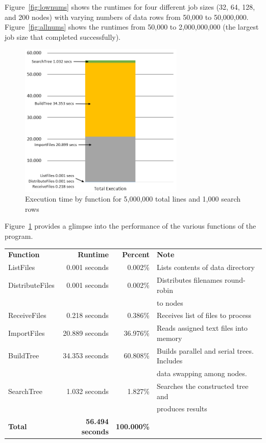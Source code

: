 Figure~\ref{fig:lownums} shows the runtimes for four different job sizes (32, 64, 128, and 200 nodes) with varying numbers of data rows from 50,000 to 50,000,000. Figure~\ref{fig:allnums} shows the runtimes from 50,000 to 2,000,000,000 (the largest job size that completed successfully).


\begin{figure}[h!]
\centering
\includegraphics[width=0.7\textwidth]{./images/Runtime3.png}
\caption{Execution time by function for 5,000,000 total lines and 1,000 search rows}
\label{fig:breakdown}
\end{figure}


Figure~\ref{fig:breakdown} provides a glimpse into the performance of the various functions of the program.

\begin{tabular}{l r r l}
\textbf{Function}         & \textbf{Runtime}        & \textbf{Percent} & \textbf{Note} \\
ListFiles        &  0.001 seconds & 0.002\% & Lists contents of data directory \\
DistributeFiles  &  0.001 seconds & 0.002\% & Distributes filenames round-robin \\
& & & to nodes \\
ReceiveFiles     &  0.218 seconds & 0.386\% & Receives list of files to process \\
ImportFiles      & 20.889 seconds & 36.976\% & Reads assigned text files into memory \\
BuildTree        & 34.353 seconds & 60.808\% & Builds parallel and serial trees. Includes \\
& & & data swapping among nodes.\\
SearchTree       &  1.032 seconds & 1.827\% & Searches the constructed tree and \\
& & &  produces results \\
\textbf{Total}   & \textbf{56.494 seconds} & \textbf{100.000\%} & \\
\end{tabular}


